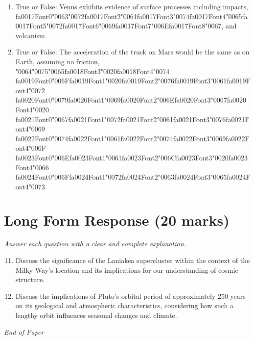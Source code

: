\documentclass[12pt]{article}
\begin{document}
\begin{enumerate}[label=\arabic*.]
\item True or False: Venus exhibits evidence of surface processes including impacts, {\csname fa0017Font0\endcsname\char"0063}{\char"0072}{\csname fa0017Font2\endcsname\char"0061}{\csname fa0017Font3\endcsname\char"0074}{\csname fa0017Font4\endcsname\char"0065}{\csname fa0017Font5\endcsname\char"0072}{\csname fa0017Font6\endcsname\char"0069}{\csname fa0017Font7\endcsname\char"006E}{\csname fa0017Font8\endcsname\char"0067}, and volcanism.
\item True or False: The acceleration of the truck on Mars would be the same as on Earth, assuming no friction, {\char"0064}{\char"0075}{\char"0065}{\csname fa0018Font3\endcsname\char"0020}{\csname fa0018Font4\endcsname\char"0074} {\csname fa0019Font0\endcsname\char"006F}{\csname fa0019Font1\endcsname\char"0020}{\csname fa0019Font2\endcsname\char"0076}{\csname fa0019Font3\endcsname\char"0061}{\csname fa0019Font4\endcsname\char"0072} {\csname fa0020Font0\endcsname\char"0079}{\csname fa0020Font1\endcsname\char"0069}{\csname fa0020Font2\endcsname\char"006E}{\csname fa0020Font3\endcsname\char"0067}{\csname fa0020Font4\endcsname\char"0020} {\csname fa0021Font0\endcsname\char"0067}{\csname fa0021Font1\endcsname\char"0072}{\csname fa0021Font2\endcsname\char"0061}{\csname fa0021Font3\endcsname\char"0076}{\csname fa0021Font4\endcsname\char"0069} {\csname fa0022Font0\endcsname\char"0074}{\csname fa0022Font1\endcsname\char"0061}{\csname fa0022Font2\endcsname\char"0074}{\csname fa0022Font3\endcsname\char"0069}{\csname fa0022Font4\endcsname\char"006F} {\csname fa0023Font0\endcsname\char"006E}{\csname fa0023Font1\endcsname\char"0061}{\csname fa0023Font2\endcsname\char"006C}{\csname fa0023Font3\endcsname\char"0020}{\csname fa0023Font4\endcsname\char"0066} {\csname fa0024Font0\endcsname\char"006F}{\csname fa0024Font1\endcsname\char"0072}{\csname fa0024Font2\endcsname\char"0063}{\csname fa0024Font3\endcsname\char"0065}{\csname fa0024Font4\endcsname\char"0073}.
\end{enumerate}

\section*{Long Form Response (20 marks)}
\textit{Answer each question with a clear and complete explanation.}
\begin{enumerate}[label=\arabic*.]
\setcounter{enumi}{10}
\item Discuss the significance of the Laniakea supercluster within the context of the Milky
Way's location and its implications for our understanding of cosmic structure.
\item Discuss the implications of Pluto's orbital period of approximately 250 years on its
geological and atmospheric characteristics, considering how such a lengthy orbit
influences seasonal changes and climate.
\end{enumerate}

\vfill
\noindent\textit{End of Paper}
\end{document}
